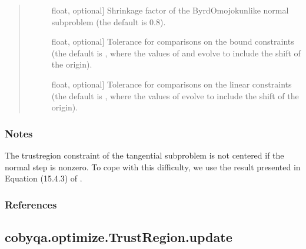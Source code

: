 \documentclass[letterpaper,10pt,english]{sphinxmanual}
\begin{document}
\begin{fulllineitems}
\begin{fulllineitems}
\begin{quote}
\begin{description}
\begin{description}
\item[{}] \leavevmode{[}float, optional{]}
\sphinxAtStartPar
Shrinkage factor of the Byrd\sphinxhyphen{}Omojokun\sphinxhyphen{}like normal subproblem (the
default is 0.8).

\item[{}] \leavevmode{[}float, optional{]}
\sphinxAtStartPar
Tolerance for comparisons on the bound constraints (the default is
, where the
values of  and  evolve to include the shift of the
origin).

\item[{}] \leavevmode{[}float, optional{]}
\sphinxAtStartPar
Tolerance for comparisons on the linear constraints (the default is
, where the values of
 evolve to include the shift of the origin).

\end{description}

\end{description}\end{quote}
\subsubsection*{Notes}

\sphinxAtStartPar
The trust\sphinxhyphen{}region constraint of the tangential subproblem is not centered
if the normal step is nonzero. To cope with this difficulty, we use the
result presented in Equation (15.4.3) of .
\subsubsection*{References}

\sphinxAtStartPar
{}

\end{fulllineitems}



\subsection{cobyqa.optimize.TrustRegion.update}
\label{\detokenize{refs/generated/cobyqa.optimize.TrustRegion.update:cobyqa-optimize-trustregion-update}}\label{\detokenize{refs/generated/cobyqa.optimize.TrustRegion.update::doc}}


\end{fulllineitems}
\end{document}

